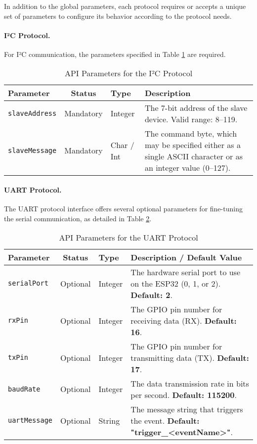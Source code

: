 In addition to the global parameters, each protocol requires or accepts a unique set of parameters to configure its behavior according to the protocol needs.

\paragraph{I²C Protocol.} For I²C communication, the parameters specified in Table \ref{tab:i2c_params} are required.

\begin{table}[h!]
    \centering
    \caption{API Parameters for the I²C Protocol}
    \label{tab:i2c_params}
    \begin{tabular}{|l|c|l|p{6cm}|}
        \hline
        \textbf{Parameter} & \textbf{Status} & \textbf{Type} & \textbf{Description} \\ \hline
        \texttt{slaveAddress} & Mandatory & Integer & The 7-bit address of the slave device. Valid range: 8–119. \\ \hline
        \texttt{slaveMessage} & Mandatory & Char / Int & The command byte, which may be specified either as a single ASCII character or as an integer value (0–127). \\ \hline
    \end{tabular}
\end{table}

\paragraph{UART Protocol.} The UART protocol interface offers several optional parameters for fine-tuning the serial communication, as detailed in Table \ref{tab:uart_params}.

\begin{table}[h!]
    \centering
    \caption{API Parameters for the UART Protocol}
    \label{tab:uart_params}
    \begin{tabular}{|l|c|l|p{6cm}|}
        \hline
        \textbf{Parameter} & \textbf{Status} & \textbf{Type} & \textbf{Description / Default Value} \\ \hline
        \texttt{serialPort} & Optional & Integer & The hardware serial port to use on the ESP32 (0, 1, or 2). \textbf{Default: 2}. \\ \hline
        \texttt{rxPin} & Optional & Integer & The GPIO pin number for receiving data (RX). \textbf{Default: 16}. \\ \hline
        \texttt{txPin} & Optional & Integer & The GPIO pin number for transmitting data (TX). \textbf{Default: 17}. \\ \hline
        \texttt{baudRate} & Optional & Integer & The data transmission rate in bits per second. \textbf{Default: 115200}. \\ \hline
        \texttt{uartMessage} & Optional & String & The message string that triggers the event. \textbf{Default: "trigger\_<eventName>"}. \\ \hline
    \end{tabular}
\end{table}

